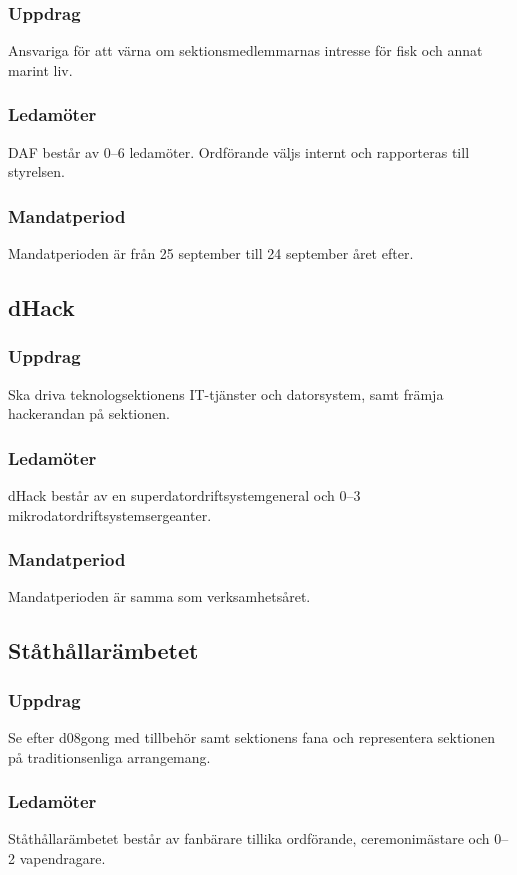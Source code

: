\subsubsection{Uppdrag}
Ansvariga för att värna om sektionsmedlemmarnas intresse för fisk och
annat marint liv.
\subsubsection{Ledamöter}
DAF består av 0--6 ledamöter. Ordförande väljs internt och rapporteras till styrelsen.
\subsubsection{Mandatperiod}
Mandatperioden är från 25 september till 24 september året efter.

\subsection{dHack}
\subsubsection{Uppdrag}
Ska driva teknologsektionens IT-tjänster och datorsystem, samt
främja hackerandan på sektionen.
\subsubsection{Ledamöter}
dHack består av en superdatordriftsystemgeneral och 0--3 mikrodatordriftsystemsergeanter.
\subsubsection{Mandatperiod}
Mandatperioden är samma som verksamhetsåret.

\subsection{Ståthållarämbetet}
\subsubsection{Uppdrag}
Se efter d08gong med tillbehör samt sektionens fana och representera sektionen på traditionsenliga arrangemang.
\subsubsection{Ledamöter}
  Ståthållarämbetet består av fanbärare tillika ordförande, ceremonimästare och 0--2 vapendragare.
